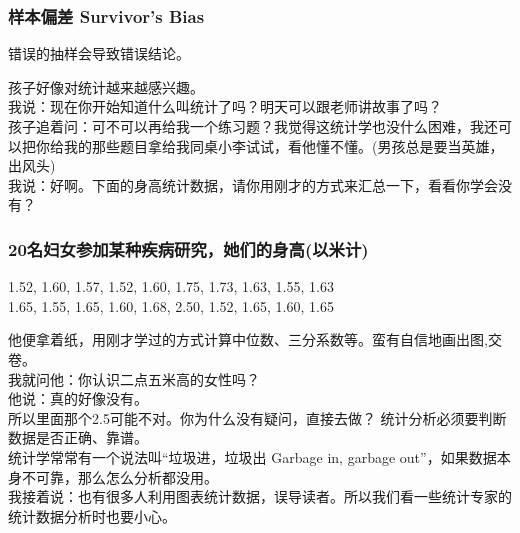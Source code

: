 \hypertarget{ux6837ux672cux504fux5dee-survivors-bias}{%
\subsubsection{样本偏差 Survivor's
Bias}\label{ux6837ux672cux504fux5dee-survivors-bias}}

错误的抽样会导致错误结论。


孩子好像对统计越来越感兴趣。\\
我说：现在你开始知道什么叫统计了吗？明天可以跟老师讲故事了吗？\\
孩子追着问：可不可以再给我一个练习题？我觉得这统计学也没什么困难，我还可以把你给我的那些题目拿给我同桌小李试试，看他懂不懂。(男孩总是要当英雄，出风头)\\
我说：好啊。下面的身高统计数据，请你用刚才的方式来汇总一下，看看你学会没有？\\

\hypertarget{ux540dux5987ux5973ux53c2ux52a0ux67d0ux79cdux75beux75c5ux7814ux7a76ux5979ux4eecux7684ux8eabux9ad8ux4ee5ux7c73ux8ba1}{%
\subsubsection{20名妇女参加某种疾病研究，她们的身高(以米计)}\label{ux540dux5987ux5973ux53c2ux52a0ux67d0ux79cdux75beux75c5ux7814ux7a76ux5979ux4eecux7684ux8eabux9ad8ux4ee5ux7c73ux8ba1}}

1.52, 1.60, 1.57, 1.52, 1.60, 1.75, 1.73, 1.63, 1.55, 1.63\\
1.65, 1.55, 1.65, 1.60, 1.68, 2.50, 1.52, 1.65, 1.60, 1.65

他便拿着纸，用刚才学过的方式计算中位数、三分系数等。蛮有自信地画出图,交卷。\\
我就问他：你认识二点五米高的女性吗？\\
他说：真的好像没有。\\
所以里面那个2.5可能不对。你为什么没有疑问，直接去做？
统计分析必须要判断数据是否正确、靠谱。\\
统计学常常有一个说法叫``垃圾进，垃圾出 Garbage in, garbage
out''，如果数据本身不可靠，那么怎么分析都没用。\\
我接着说：也有很多人利用图表统计数据，误导读者。所以我们看一些统计专家的统计数据分析时也要小心。\\

